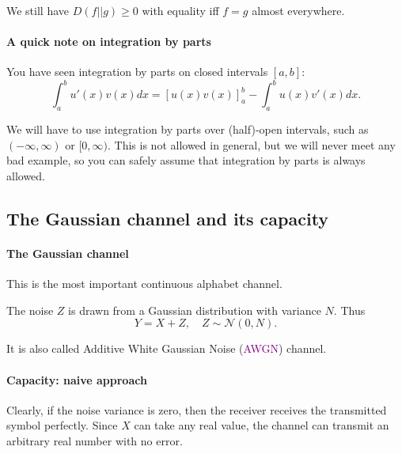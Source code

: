 \documentclass[a4paper, 11pt, openany]{book}
\numberwithin{equation}{section}
\theoremstyle{plain}
\theoremstyle{definition}
\newcommand{\Define}[1]{\textcolor{purple}{#1}}
\newcommand{\alphabet}[1]{\mathcal{#1}}
\begin{document}
We still have $D(f||g) \ge 0$ with equality iff $f=g$ almost everywhere.






\paragraph{A quick note on integration by parts}

You have seen integration by parts on closed intervals $[a,b]$:
$$
	\int_a^b u'(x) v(x) dx =  \left[u(x) v(x) \right]_a^b - \int_a^b u(x) v'(x) dx.
$$

We will have to use integration by parts over (half)-open intervals, such as $(- \infty, \infty)$ or $[0, \infty)$. This is not allowed in general, but we will never meet any bad example, so you can safely assume that integration by parts is always allowed.



\subsection{The Gaussian channel and its capacity}

\paragraph{The Gaussian channel}
This is the most important continuous alphabet channel.

\begin{figure}
\centering
{}
\end{figure}

The noise $Z$ is drawn from a Gaussian distribution with variance $N$. Thus
\[
	Y = X + Z, \quad Z \sim \alphabet{N}(0,N).
\]

It is also called Additive White Gaussian Noise (\Define{AWGN}) channel.



\paragraph{Capacity: naive approach}
Clearly, if the noise variance is zero, then the receiver receives the transmitted symbol perfectly. Since $X$ can take any real value, the channel can transmit an arbitrary real number with no error.
\end{document}
